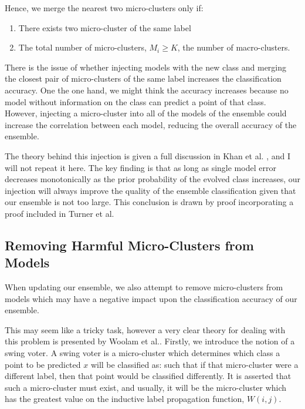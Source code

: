 \documentclass[12pt,a4paper,oneside]{report}
\begin{document}
Hence, we merge the nearest two micro-clusters only if:

\begin{enumerate}
\item There exists two micro-cluster of the same label
\item The total number of micro-clusters, \( M_i \geq K \), the number of macro-clusters. 
\end{enumerate}

There is the issue of whether injecting models with the new class and merging the closest pair of micro-clusters of the same label increases the classification accuracy. One the one hand, we might think the accuracy increases because no model without information on the class can predict a point of that class. However, injecting a micro-cluster into all of the models of the ensemble could increase the correlation between each model, reducing the overall accuracy of the ensemble. \cite{Inject}

The theory behind this injection is given a full discussion in Khan et al. \cite{TechRep}, and I will not repeat it here. The key finding is that as long as single model error decreases monotonically as the prior probability of the evolved class increases, our injection will always improve the quality of the ensemble classification given that our ensemble is not too large. This conclusion is drawn by proof incorporating a proof included in Turner et al.\cite{Inject}

\subsection{Removing Harmful Micro-Clusters from Models}

When updating our ensemble, we also attempt to remove micro-clusters from models which may have a negative impact upon the classification accuracy of our ensemble. 

This may seem like a tricky task, however a very clear theory for dealing with this problem is presented by Woolam et al.\cite{LabStr}. Firstly, we introduce the notion of a swing voter. A swing voter is a micro-cluster which determines which class a point to be predicted $x$ will be classified as: such that if that micro-cluster were a different label, then that point would be classified differently. It is asserted that such a micro-cluster must exist, and usually, it will be the micro-cluster which has the greatest value on the inductive label propagation function, $W(i,j)$.
\end{document}
